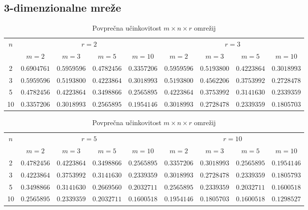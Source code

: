 \documentclass[a4paper, 16pt]{article}
\begin{document}
    \subsection{3-dimenzionalne mreže}
    \begin{table}[!h]
        \begin{tabular}{c|c|c|c|c||c|c|c|c}
            \multirow{2}{*}{$n$} & 
            \multicolumn{4}{c}{$r = 2$} & \multicolumn{4}{c}{$r = 3$}\\
               & $m=2$       & $m=3$       & $m=5$       & $m=10$      & $m = 2$     & $m = 3$    & $m=5$        & $m=10$ \\ \hline
            2  & $0.6904761$ & $0.5959596$ & $0.4782456$ & $0.3357206$ & $0.5959596$ & $0.5193800$ & $0.4223864$ & $0.3018993$\\
            3  & $0.5959596$ & $0.5193800$ & $0.4223864$ & $0.3018993$ & $0.5193800$ & $0.4562206$ & $0.3753992$ & $0.2728478$\\
            5  & $0.4782456$ & $0.4223864$ & $0.3498866$ & $0.2565895$ & $0.4223864$ & $0.3753992$ & $0.3141630$ & $0.2339359$ \\
            10 & $0.3357206$ & $0.3018993$ & $0.2565895$ & $0.1954146$ & $0.3018993$ & $0.2728478$ & $0.2339359$ & $0.1805703$\\

        \end{tabular}
        \caption{Povprečna učinkovitost $m \times n \times r$ omrežij}
        \label{table: 2}
    \end{table}

    \begin{table}[!h]
        \begin{tabular}{c|c|c|c|c||c|c|c|c}
            \multirow{2}{*}{$n$} & 
            \multicolumn{4}{c}{$r = 5$} & \multicolumn{4}{c}{$r = 10$}\\
               & $m=2$       & $m=3$       & $m=5$       & $m=10$      & $m = 2$     & $m = 3$     & $m=5$       & $m=10$ \\ \hline
            2  & $0.4782456$ & $0.4223864$ & $0.3498866$ & $0.2565895$ & $0.3357206$ & $0.3018993$ & $0.2565895$ & $0.1954146$\\
            3  & $0.4223864$ & $0.3753992$ & $0.3141630$ & $0.2339359$ & $0.3018993$ & $0.2728478$ & $0.2339359$ & $0.1805793$\\
            5  & $0.3498866$ & $0.3141630$ & $0.2669560$ & $0.2032711$ & $0.2565895$ & $0.2339359$ & $0.2032711$ & $0.1600518$\\
            10 & $0.2565895$ & $0.2339359$ & $0.2032711$ & $0.1600518$ & $0.1954146$ & $0.1805703$ & $0.1600518$ & $0.1298527$\\

        \end{tabular}
        \caption{Povprečna učinkovitost $m \times n \times r$ omrežij}
        \label{table: 3}
    \end{table}
\end{document}
